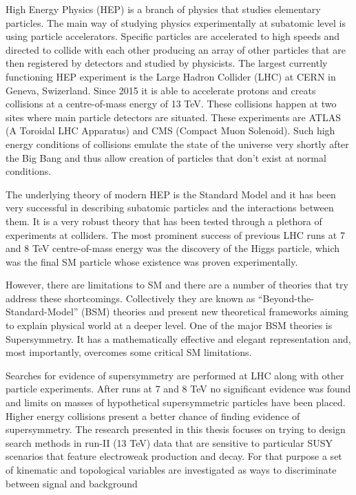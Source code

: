 High Energy Physics (HEP) is a branch of physics that studies elementary particles. The main way of studying physics experimentally at subatomic level is using particle accelerators. Specific particles are accelerated to high speeds and directed to collide with each other producing an array of other particles that are then registered by detectors and studied by physicists. The largest currently functioning HEP experiment is the Large Hadron Collider (LHC) at CERN in Geneva, Swizerland. Since 2015 it is able to accelerate protons and creats collisions at a centre-of-mass energy of 13 TeV. These collisions happen at two sites where main particle detectors are situated. These experiments are ATLAS (A Toroidal LHC Apparatus) and CMS (Compact Muon Solenoid). Such high energy conditions of collisions emulate the state of the universe very shortly after the Big Bang and thus allow creation of particles that don't exist at normal conditions. 

The underlying theory of modern HEP is the Standard Model and it has been very successful in describing subatomic particles and the interactions between them. It is a very robust theory that has been tested through a plethora of experiments at colliders. The most prominent success of previous LHC runs at 7 and 8 TeV centre-of-mass energy was the discovery of the Higgs particle, which 
was the final SM particle whose existence was proven experimentally.   

However, there are limitations to SM and there are a number of theories that try address these shortcomings. Collectively they are known as “Beyond-the-Standard-Model” (BSM) theories and present new theoretical frameworks aiming to explain physical world at a deeper level. One of the major BSM theories is Supersymmetry. It has a mathematically effective and elegant representation and, most importantly, overcomes some critical SM limitations.

Searches for evidence of supersymmetry are performed at LHC along with other particle experiments. After runs at 7 and 8 TeV no significant evidence was found and limits on masses of hypothetical supersymmetric particles have been placed. Higher energy collisions present a better chance of finding  evidence of supersymmetry. The research presented in this thesis focuses on trying to design search methods in run-II (13 TeV) data that are sensitive to particular SUSY scenarios that feature electroweak production and decay. For that purpose a set of kinematic and topological variables are investigated as ways to discriminate between signal and background
